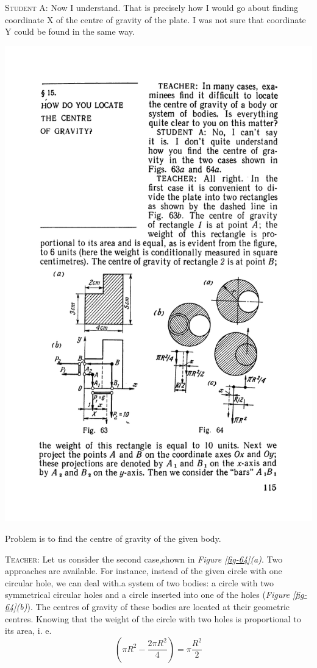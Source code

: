 \documentclass[a4paper,sfsidenotes]{tufte-book}
\begin{document}
\textsc{Student A:} Now I understand. That is precisely how I would go about finding coordinate X of the centre of gravity of the plate. I was not sure that coordinate Y could be found in the same way.
\\
\begin{marginfigure}
\centering
\includegraphics[width=\linewidth,angle=2]{fig-064a.pdf}
\caption{Problem is to find the centre of gravity of the given body.}
\label{fig-64}
\end{marginfigure}
\textsc{Teacher:} Let us consider the second case,shown in \emph{Figure \ref{fig-64}(a)}. Two approaches are available. For instance, instead of the given circle with one circular hole, we can deal with.a system of two bodies: a circle with two symmetrical circular holes and a circle inserted into one of the holes (\emph{Figure \ref{fig-64}(b)}). The centres of gravity of these bodies are located at their geometric centres. Knowing that the weight of the circle with two holes is proportional to its area, i. e. 
\begin{equation*}%
\left ( \pi R^{2} -  \frac{2 \pi R^{2}}{4} \right) = \pi \frac{R^{2}}{2}
\end{equation*}
\end{document}
